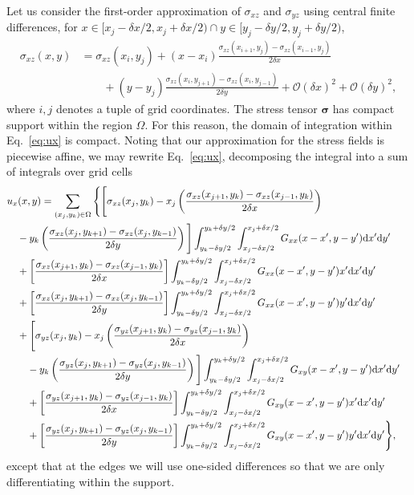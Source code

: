 \documentclass{article}
\newcommand{\dd}{\mathrm{d}}
\begin{document}
 Let us consider the first-order approximation of $\sigma_{xz}$ and $\sigma_{yz}$ using central finite differences, for $x\in[x_j - \delta x/2, x_j+\delta x/2) \cap y\in[y_j-\delta y/2, y_j + \delta y /2)$,
\begin{align}
\sigma_{xz}(x,y) &= \sigma_{xz}(x_i , y_j) + (x-x_i)\frac{\sigma_{xz}(x_{i+1},y_j) -\sigma_{xz}(x_{i-1},y_j) }{2\delta x}  \nonumber\\
&\qquad + (y-y_j)\frac{\sigma_{xz}(x_i,y_{j+1}) - \sigma_{xz}(x_i,y_{j-1}) }{2\delta y} + \mathcal{O}(\delta x)^2 + \mathcal{O}(\delta y)^2,\label{eq:sigma_affine}
\end{align}
where $i,j$ denotes a tuple of grid coordinates. The stress tensor $\boldsymbol{\sigma}$ has compact support within the region $\Omega$. For this reason, the domain of integration within Eq.~\ref{eq:ux} is compact. Noting that our approximation for the stress fields is piecewise affine, we may rewrite Eq.~\ref{eq:ux}, decomposing the integral into a sum of integrals over grid cells
\begin{align}
\lefteqn{ u_x(x,y) = \sum_{(x_j,y_k)\in\Omega} \Bigg\{ \Bigg[\sigma_{xz}(x_j,y_k) -x_j\left(\frac{\sigma_{xz}(x_{j+1},y_k) - \sigma_{xz}(x_{j-1},y_k) }{2\delta x }    \right)   } \nonumber\\
&\quad -y_k\left( \frac{\sigma_{xz}(x_j,y_{k+1}) -  \sigma_{xz}(x_j,y_{k-1}) }{2\delta y}\right) \Bigg]  \int_{y_k-\delta y/2}^{y_k+\delta y/2}  \int_{x_j-\delta x/2}^{x_j+\delta x/2} G_{xx}(x-x',y-y')  \dd x' \dd y' \nonumber \\
&\quad+\left[ \frac{\sigma_{xz}(x_{j+1},y_k) -  \sigma_{xz}(x_{j-1},y_k) }{2\delta x}   \right]  \int_{y_k-\delta y/2}^{y_k+\delta y/2}  \int_{x_j-\delta x/2}^{x_j+\delta x/2}  G_{xx}(x-x',y-y')   x'\dd x' \dd y'  \nonumber\\
&\quad + \left[  \frac{\sigma_{xz}(x_j,y_{k+1}) - \sigma_{xz}(x_j,y_{k-1}) }{2\delta y} \right] \int_{y_k-\delta y/2}^{y_k+\delta y/2}  \int_{x_j-\delta x/2}^{x_j+\delta x/2}  G_{xx}(x-x',y-y')  y'\dd x' \dd y' \nonumber\\
&\quad+  \Bigg[\sigma_{yz}(x_j,y_k) -x_j\left(\frac{\sigma_{yz}(x_{j+1},y_k) - \sigma_{yz}(x_{j-1},y_k) }{2\delta x}    \right)    \nonumber\\
&\qquad -y_k\left( \frac{\sigma_{yz}(x_j,y_{k+1}) - \sigma_{yz}(x_j,y_{k-1}) }{2\delta y}\right) \Bigg]  \int_{y_k-\delta y/2}^{y_k+\delta y/2}  \int_{x_j-\delta x/2}^{x_j+\delta x/2} G_{xy}(x-x',y-y')  \dd x' \dd y' \nonumber \\
&\qquad +\left[ \frac{\sigma_{yz}(x_{j+1},y_k) -  \sigma_{yz}(x_{j-1},y_k) }{2\delta x}   \right]  \int_{y_k-\delta y/2}^{y_k+\delta y/2}  \int_{x_j-\delta x/2}^{x_j+\delta x/2}  G_{xy}(x-x',y-y')   x'\dd x' \dd y'  \nonumber\\
&\qquad+ \left[  \frac{\sigma_{yz}(x_j,y_{k+1}) - \sigma_{yz}(x_j,y_{k-1}) }{2\delta y} \right] \int_{y_k-\delta y/2}^{y_k+\delta y/2}  \int_{x_j-\delta x/2}^{x_j+\delta x/2}  G_{xy}(x-x',y-y')  y'\dd x' \dd y'  \Bigg\},
\label{eq:ux_decomposed}
\end{align}
except that at the edges we will use one-sided differences so that we are only differentiating within the support.
\end{document}
